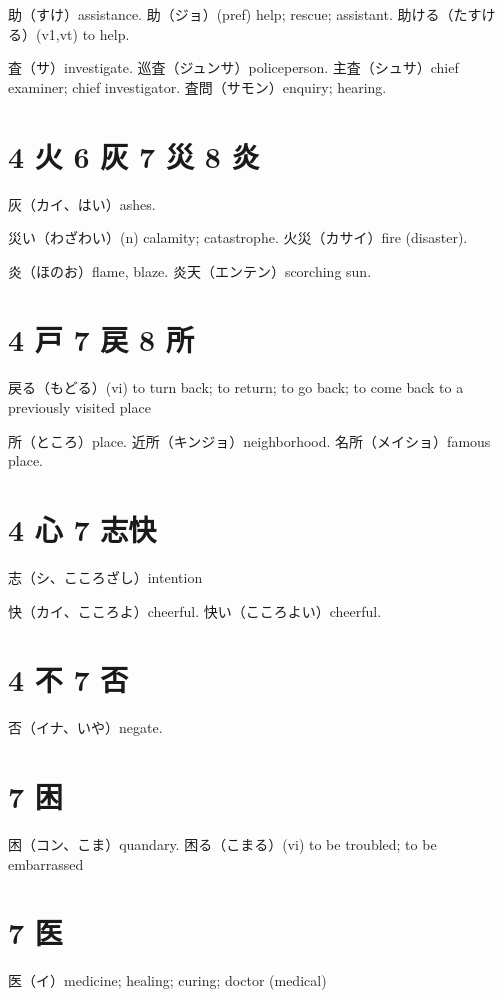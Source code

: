 助（すけ）assistance.
助（ジョ）(pref) help; rescue; assistant.
助ける（たすける）(v1,vt) to help.

査（サ）investigate.
巡査（ジュンサ）policeperson.
主査（シュサ）chief examiner; chief investigator.
査問（サモン）enquiry; hearing.

\section{4 火 6 灰 7 災 8 炎}

灰（カイ、はい）ashes.

災い（わざわい）(n) calamity; catastrophe.
火災（カサイ）fire (disaster).

炎（ほのお）flame, blaze.
炎天（エンテン）scorching sun.

\section{4 戸 7 戻 8 所}

戻る（もどる）(vi) to turn back; to return; to go back;
to come back to a previously visited place

所（ところ）place.
近所（キンジョ）neighborhood.
名所（メイショ）famous place.

\section{4 心 7 志快}

志（シ、こころざし）intention

快（カイ、こころよ）cheerful.
快い（こころよい）cheerful.

\section{4 不 7 否}

否（イナ、いや）negate.

\section{7 困}

困（コン、こま）quandary.
困る（こまる）(vi) to be troubled; to be embarrassed

\section{7 医}

医（イ）medicine; healing; curing; doctor (medical)

